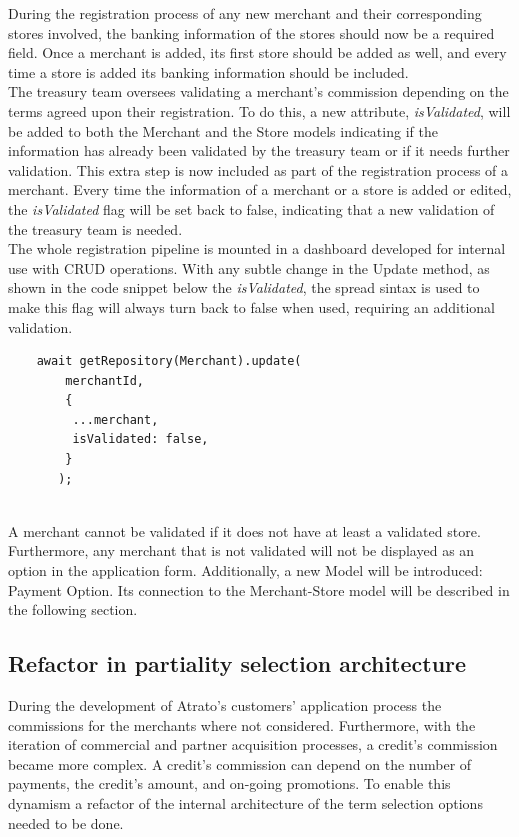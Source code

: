 During the registration process of any new merchant and their corresponding stores involved, the banking information of the stores should now be a required field. Once a merchant is added, its first store should be added as well, and every time a store is added its banking information should be included.\\

The treasury team oversees validating a merchant’s commission depending on the terms agreed upon their registration. To do this, a new attribute, \textit{isValidated}, will be added to both the Merchant and the Store models indicating if the information has already been validated by the treasury team or if it needs further validation. This extra step is now included as part of the registration process of a merchant. Every time the information of a merchant or a store is added or edited, the \textit{isValidated} flag will be set back to false, indicating that a new validation of the treasury team is needed.\\

The whole registration pipeline is mounted in a dashboard developed for internal use with CRUD operations. With any subtle change in the Update method, as shown in the code snippet below the \textit{isValidated}, the spread sintax is used to make this flag will always turn back to false when used, requiring an additional validation.

\begin{verbatim}
    await getRepository(Merchant).update(
        merchantId,
        {
         ...merchant,
         isValidated: false,
        }
       );
       
\end{verbatim}

A merchant cannot be validated if it does not have at least a validated store. Furthermore, any merchant that is not validated will not be displayed as an option in the application form.  Additionally, a new Model will be introduced: Payment Option. Its connection to the Merchant-Store model will be described in the following section.

\subsection{Refactor in partiality selection architecture}

During the development of Atrato’s customers’ application process the commissions for the merchants where not considered. Furthermore, with the iteration of commercial and partner acquisition processes, a credit’s commission became more complex. A credit’s commission can depend on the number of payments, the credit’s amount, and on-going promotions. To enable this dynamism a refactor of the internal architecture of the term selection options needed to be done.\\

